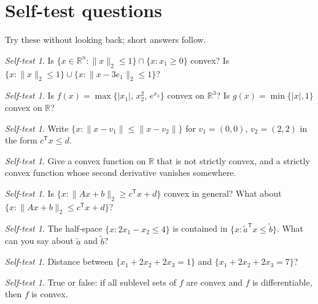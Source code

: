 \documentclass[11pt]{article}
\newcommand{\R}{\mathbb{R}}
\newcommand{\T}{^{\mathsf T}}
\theoremstyle{definition}
\theoremstyle{plain}
\theoremstyle{remark}
\newtheorem{exercise}[definition]{Self-test}
\begin{document}
\section{Self-test questions}
Try these without looking back; short answers follow.

\begin{exercise}
Is $\{x\in\R^n: \|x\|_2\le1\}\cap\{x: x_1\ge0\}$ convex? Is $\{x:\|x\|_2\le1\}\cup\{x:\|x-3e_1\|_2\le1\}$?
\end{exercise}
\begin{exercise}
Is $f(x)=\max\{|x_1|,\,x_2^2,\,e^{x_3}\}$ convex on $\R^3$? Is $g(x)=\min\{|x|,1\}$ convex on $\R$?
\end{exercise}
\begin{exercise}
Write $\{x:\|x-v_1\|\le\|x-v_2\|\}$ for $v_1=(0,0)$, $v_2=(2,2)$ in the form $c\T x\le d$.
\end{exercise}
\begin{exercise}
Give a convex function on $\R$ that is not strictly convex, and a strictly convex function whose second derivative vanishes somewhere.
\end{exercise}
\begin{exercise}
Is $\{x: \|Ax+b\|_2\ge c\T x+d\}$ convex in general? What about $\{x:\|Ax+b\|_2\le c\T x+d\}$?
\end{exercise}
\begin{exercise}
The half-space $\{x: 2x_1-x_2\le 4\}$ is contained in $\{x:\tilde a\T x\le\tilde b\}$. What can you say about $\tilde a$ and $\tilde b$?
\end{exercise}
\begin{exercise}
Distance between $\{x_1+2x_2+2x_3=1\}$ and $\{x_1+2x_2+2x_3=7\}$?
\end{exercise}
\begin{exercise}
True or false: if all sublevel sets of $f$ are convex and $f$ is differentiable, then $f$ is convex.
\end{exercise}
\end{document}
